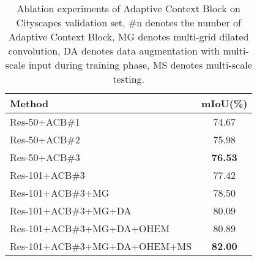 \documentclass[10pt,twocolumn,letterpaper]{article}
\begin{document}
\begin{table}[t]
\begin{center}
\begin{tabular}{l|c}
\toprule
Method & mIoU(\%)\\
\hline
\hline
 \noalign{\smallskip}
Res-50+ACB\#1 & 74.67\\
Res-50+ACB\#2 & 75.98\\
Res-50+ACB\#3& \textbf{76.53}\\ 
\hline
 \noalign{\smallskip}
Res-101+ACB\#3 & 77.42\\
Res-101+ACB\#3+MG & 78.50\\ 
Res-101+ACB\#3+MG+DA & 80.09\\
Res-101+ACB\#3+MG+DA+OHEM &80.89\\
Res-101+ACB\#3+MG+DA+OHEM+MS &\textbf{82.00}\\
\hline

\bottomrule
\end{tabular}
\end{center}
\caption{Ablation experiments of Adaptive Context Block on Cityscapes validation set, \#n  denotes the number of Adaptive Context Block, MG denotes multi-grid dilated convolution, DA denotes data augmentation with multi-scale input during training phase, MS denotes multi-scale testing. }
\vspace{-1.2em}
\label{ACBT}
\end{table}
\end{document}
